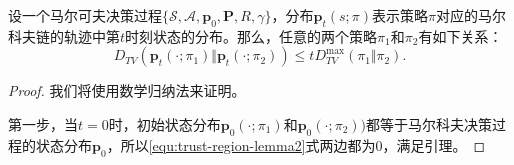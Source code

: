 \begin{lemma}\label{lem:trust-region-lemma2}
    设一个马尔可夫决策过程$\{\mathcal{S}, \mathcal{A}, \mathbf{p}_0, \mathbf{P}, R, \gamma\}$，分布$\mathbf{p}_t(s;\pi)$表示策略$\pi$对应的马尔科夫链的轨迹中第$t$时刻状态的分布。那么，任意的两个策略$\pi_1$和$\pi_2$有如下关系：
    \begin{equation}\label{equ:trust-region-lemma2}
        D_{TV}(\mathbf{p}_t(\cdot; \pi_1) \Vert \mathbf{p}_t(\cdot; \pi_2)) \le t D^{\max}_{TV}(\pi_1 \Vert \pi_2).
    \end{equation}
\end{lemma}
\begin{proof}
    我们将使用数学归纳法来证明。

    第一步，当$t=0$时，初始状态分布$\mathbf{p}_0(\cdot; \pi_1)$和$\mathbf{p}_0(\cdot; \pi_2))$都等于马尔科夫决策过程的状态分布$\mathbf{p}_0$，所以\eqref{equ:trust-region-lemma2}式两边都为0，满足引理。


\end{proof}
